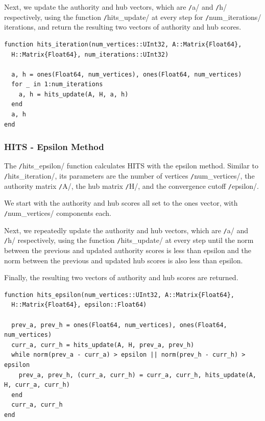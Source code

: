 \documentclass[12pt, titlepage, twoside]{amsart}
\begin{document}
Next, we update the authority and hub vectors, which are \texttt/a/ and \texttt/h/ respectively,
using the function \texttt/hits_update/ at every step for \texttt/num_iterations/ iterations, and return the resulting two vectors of authority and hub scores.

\begin{verbatim}
function hits_iteration(num_vertices::UInt32, A::Matrix{Float64},
  H::Matrix{Float64}, num_iterations::UInt32)

  a, h = ones(Float64, num_vertices), ones(Float64, num_vertices)
  for _ in 1:num_iterations
    a, h = hits_update(A, H, a, h)
  end
  a, h
end
\end{verbatim}


\subsubsection{HITS - Epsilon Method}

The \texttt/hits_epsilon/ function calculates HITS with the epsilon method.
Similar to \texttt/hits_iteration/, its parameters are the number of vertices \texttt/num_vertices/,
the authority matrix \texttt/A/, the hub matrix \texttt/H/,
and the convergence cutoff \texttt/epsilon/.

We start with the authority and hub scores all set to the ones vector, with \texttt/num_vertices/ components each.

Next, we repeatedly update the authority and hub vectors,
which are \texttt/a/ and \texttt/h/ respectively,
using the function \texttt/hits_update/ at every step until
the norm between the previous and updated authority scores is less than epsilon and
the norm between the previous and updated hub scores is also less than epsilon.

Finally, the resulting two vectors of authority and hub scores are returned.

\begin{verbatim}
function hits_epsilon(num_vertices::UInt32, A::Matrix{Float64},
  H::Matrix{Float64}, epsilon::Float64)

  prev_a, prev_h = ones(Float64, num_vertices), ones(Float64, num_vertices)
  curr_a, curr_h = hits_update(A, H, prev_a, prev_h)
  while norm(prev_a - curr_a) > epsilon || norm(prev_h - curr_h) > epsilon
    prev_a, prev_h, (curr_a, curr_h) = curr_a, curr_h, hits_update(A, H, curr_a, curr_h)
  end
  curr_a, curr_h
end
\end{verbatim}
\end{document}
